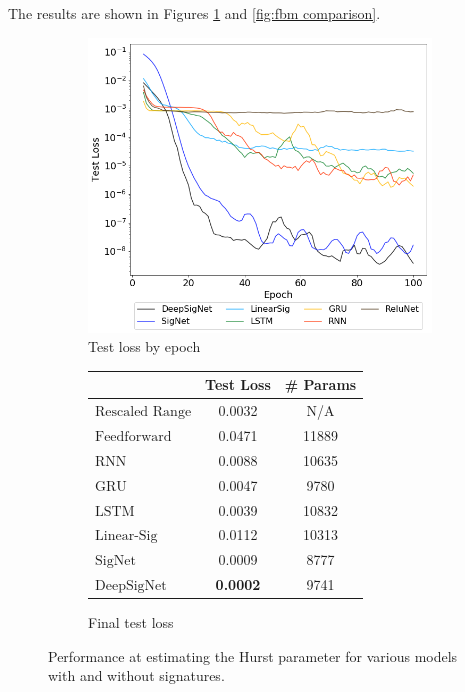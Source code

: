 \documentclass{article}
\theoremstyle{plain}
\theoremstyle{definition}
\begin{document}
The results are shown in Figures \ref{fig:fbm results} and \ref{fig:fbm comparison}.

\begin{figure}
	\begin{subfigure}{0.5\textwidth}
			\centering
			\includegraphics[width=\linewidth]{figures/final_results}
			\caption{Test loss by epoch}
	\end{subfigure}
	\begin{subfigure}{0.5\textwidth}
			\centering
			\begin{tabular}{l c c} \toprule
			    {} & {Test Loss} & {\# Params} \\ \midrule
			    $\text{Rescaled Range}$ & 0.0032 & N/A \\
			    $\text{Feedforward}$ & 0.0471 & 11889 \\
			    $\text{RNN}$  & 0.0088 & 10635  \\	
			    $\text{GRU}$  & 0.0047  & 9780   \\
			    $\text{LSTM}$  & 0.0039 & 10832  \\
			    $\text{Linear-Sig}$  & 0.0112 & 10313 \\
			    $\text{SigNet}$  & 0.0009 & 8777  \\
			    $\text{DeepSigNet}$  & \textbf{0.0002} & 9741  \\ \bottomrule
			\end{tabular}
			\caption{Final test loss}
	\end{subfigure}
	\caption{Performance at estimating the Hurst parameter for various models with and without signatures.}
	\label{fig:fbm results}
\end{figure}
\end{document}
